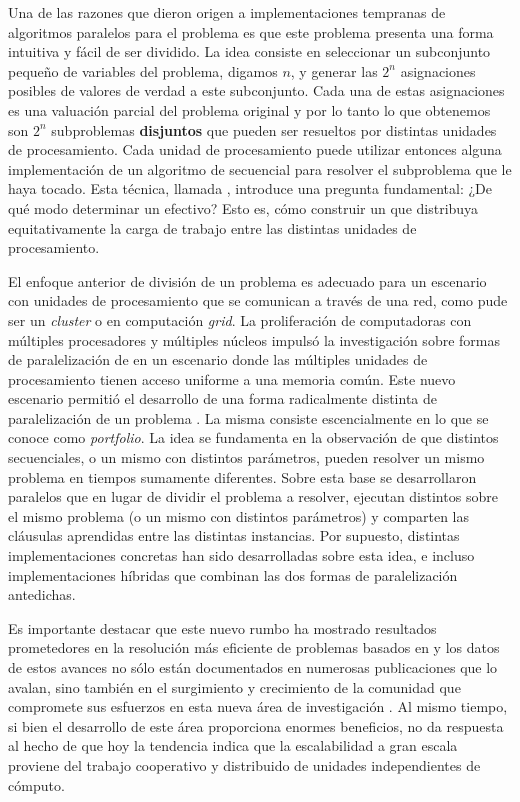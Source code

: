 Una de las razones que dieron origen a implementaciones tempranas de
algoritmos paralelos para el problema \sat es que este problema presenta una
forma intuitiva y fácil de ser dividido. La idea consiste en seleccionar un
subconjunto pequeño de variables del problema, digamos $n$, y generar las
$2^n$ asignaciones posibles de valores de verdad a este subconjunto. Cada una
de estas asignaciones es una valuación parcial del problema original y por lo
tanto lo que obtenemos son $2^n$ subproblemas \textbf{disjuntos} que pueden
ser resueltos por distintas unidades de procesamiento. Cada unidad de
procesamiento puede utilizar entonces alguna implementación de un algoritmo de
\ssolving secuencial para resolver el subproblema que le haya tocado. Esta
técnica, llamada \gp, introduce una pregunta fundamental: ¿De qué modo
determinar un \gp efectivo? Esto es, cómo construir un \gp que distribuya
equitativamente la carga de trabajo entre las distintas unidades de
procesamiento.

El enfoque anterior de división de un problema \sat es adecuado para un
escenario con unidades de procesamiento que se comunican a través de una red,
como pude ser un \emph{cluster} o en computación \emph{grid}. La proliferación
de computadoras con múltiples procesadores y múltiples núcleos impulsó la
investigación sobre formas de paralelización de \ssolvers en un escenario
donde las múltiples unidades de procesamiento tienen acceso uniforme a una
memoria común. Este nuevo escenario permitió el desarrollo de una forma
radicalmente distinta de paralelización de un problema \sat. La misma consiste
escencialmente en lo que se conoce como \emph{portfolio}. La idea se
fundamenta en la observación de que distintos \ssolvers secuenciales, o un
mismo \ssolver con distintos parámetros, pueden resolver un mismo problema en
tiempos sumamente diferentes. Sobre esta base se desarrollaron \ssolvers
paralelos que en lugar de dividir el problema a resolver, ejecutan distintos
\ssolvers sobre el mismo problema (o un mismo \ssolver con distintos
parámetros) y comparten las cláusulas aprendidas entre las distintas
instancias. Por supuesto, distintas implementaciones concretas han sido
desarrolladas sobre esta idea, e incluso implementaciones híbridas que
combinan las dos formas de paralelización antedichas.

Es importante destacar que este nuevo rumbo ha mostrado resultados
prometedores en la resolución más eficiente de problemas basados en \sat y los
datos de estos avances no sólo están documentados en numerosas publicaciones
que lo avalan, sino también en el surgimiento y crecimiento de la comunidad
que compromete sus esfuerzos en esta nueva área de investigación
. Al mismo tiempo, si bien el desarrollo de este área
proporciona enormes beneficios, no da respuesta al hecho de que hoy la
tendencia indica que la escalabilidad a gran escala proviene del trabajo
cooperativo y distribuido de unidades independientes de cómputo.

